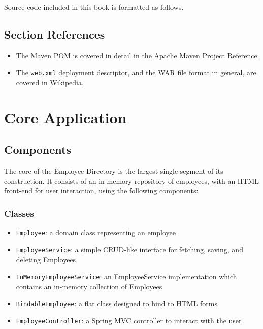 \documentclass{article}
\begin{document}
Source code included in this book is formatted as follows.



\subsection{Section References}

\begin{itemize}
\item The Maven POM is covered in detail in the \href{http://maven.apache.org/pom.html}{Apache Maven Project Reference}.
\item The \texttt{web.xml} deployment descriptor, and the WAR file format in general, are covered in \href{http://en.wikipedia.org/wiki/WAR_(Sun_file_format)}{Wikipedia}.
\end{itemize}

\pagebreak
\section{Core Application}

\subsection{Components}

The core of the Employee Directory is the largest single segment of its construction.  It consists of an in-memory repository of employees, with an HTML front-end for user interaction, using the following components:

\subsubsection{Classes}
\begin{itemize}
\item \texttt{Employee}: a domain class representing an employee
\item \texttt{EmployeeService}: a simple CRUD-like interface for fetching, saving, and deleting Employees
\item \texttt{InMemoryEmployeeService}: an EmployeeService implementation which contains an in-memory collection of Employees
\item \texttt{BindableEmployee}: a flat class designed to bind to HTML forms
\item \texttt{EmployeeController}: a Spring MVC controller to interact with the user
\end{itemize}
\end{document}
